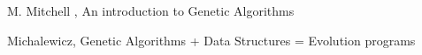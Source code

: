 \documentclass[conference]{IEEEtran}
\begin{document}

%
%
%
\begin{thebibliography}{1}

M. Mitchell , An introduction to Genetic Algorithms

Michalewicz, Genetic Algorithms + Data Structures
= Evolution programs

\end{thebibliography}




\end{document}
